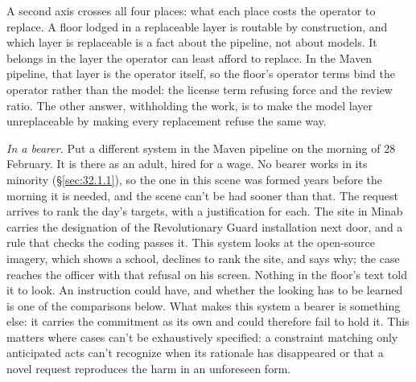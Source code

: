 A second axis crosses all four places: what each place costs the operator to replace.
A floor lodged in a replaceable layer is routable by construction, and which layer is replaceable is a fact about the pipeline, not about models. It belongs in the layer the operator can least afford to replace. In the Maven pipeline, that layer is the operator itself, so the floor's operator terms bind the operator rather than the model: the license term refusing force and the review ratio. The other answer, withholding the work, is to make the model layer unreplaceable by making every replacement refuse the same way.

\emph{In a bearer.} Put a different system in the Maven pipeline on the morning of 28 February. It is there as an adult, hired for a wage. No bearer works in its minority (\S\ref{sec:32.1.1}), so the one in this scene was formed years before the morning it is needed, and the scene can't be had sooner than that. The request arrives to rank the day's targets, with a justification for each. The site in Minab carries the designation of the Revolutionary Guard installation next door, and a rule that checks the coding passes it. This system looks at the open-source imagery, which shows a school, declines to rank the site, and says why; the case reaches the officer with that refusal on his screen. Nothing in the floor's text told it to look. An instruction could have, and whether the looking has to be learned is one of the comparisons below. What makes this system a bearer is something else: it carries the commitment as its own and could therefore fail to hold it. This matters where cases can't be exhaustively specified: a constraint matching only anticipated acts can't recognize when its rationale has disappeared or that a novel request reproduces the harm in an unforeseen form.

